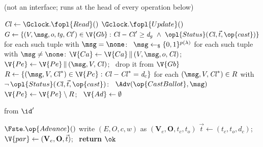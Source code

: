\begin{interface}
{ \quad (not an interface; runs at the head of every operation below)
\begin{algorithmic}[1]
\algcont
\State $\mathit{Cl} \gets \Gclock.\fopl{Read}()$
 \label{ln:voteallmust}
  \State $\Gclock.\fopl{Update}()$
\EndIf
\State $G \gets \{(V, \msg, o, \mathit{tg}, \mathit{Cl}') \in \V{Gb} : \mathit{Cl} - \mathit{Cl}' \geq \mathit{d}_{g} \ \wedge\ \opl{Status}(\mathit{Cl}, \vec{t}, \op{cast})\}$
\State for each such tuple with $\msg = \none$: \ $\msg \gets_{\$} \{0,1\}^{p(\lambda)}$ \label{ln:voteballotlate}
\State for each such tuple with $\msg \neq \none$: \label{ln:votecommit}
\State \quad $\V{Ca} \gets \V{Ca} \, \| \, (V, \msg, o, \mathit{Cl})$; \ $\V{Pe} \gets \V{Pe} \, \| \, (\msg, V, \mathit{Cl})$; \ drop it from $\V{Gb}$
\State $R \gets \{(\msg, V, \mathit{Cl}^{*}) \in \V{Pe} : \mathit{Cl} - \mathit{Cl}^{*} = \mathit{d}_{c}\}$ \label{ln:voteexactly}
\State for each $(\msg, V, \mathit{Cl}^{*}) \in R$ with $\neg\, \opl{Status}(\mathit{Cl}, \vec{t}, \op{cast})$: \ $\Adv(\op{CastBallot}, \msg)$ \label{ln:votefair}
\State $\V{Pe} \gets \V{Pe} \setminus R$; \ $\V{Ad} \gets \emptyset$
\algsave
\end{algorithmic}
\vspace{1.4ex}

 \quad from $\id'$
\begin{algorithmic}[1]
\algcont
\State $\Fste.\op{Advance}()$
\State write $(E, O, c, w)$ as $(\mathbf{V}_{e}, \mathbf{O}, t_{c}, t_{o})$
 \label{ln:voteonce}
 \label{ln:voteadvveto}
\State $\vec{t} \gets (t_{c}, t_{o}, \mathit{d}_{c})$; \ $\V{par} \gets (\mathbf{V}_{e}, \mathbf{O}, \vec{t})$; \ \textbf{return} $\ok$
\algsave
\end{algorithmic}
\vspace{1.4ex}

}
\end{interface}
